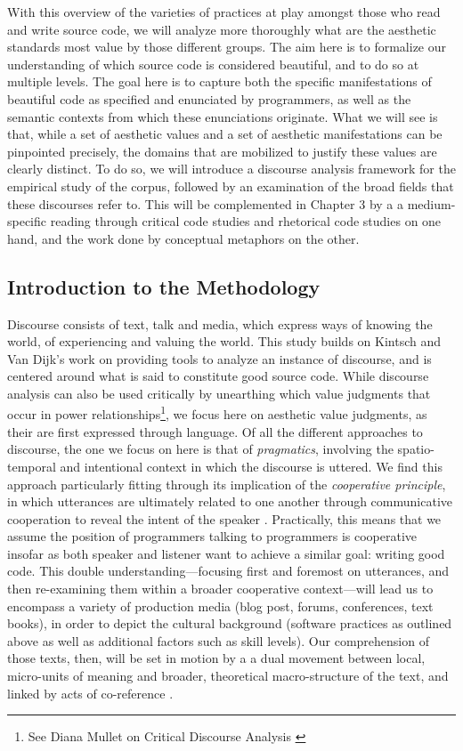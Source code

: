 With this overview of the varieties of practices at play amongst those who read and write source code, we will analyze more thoroughly what are the aesthetic standards most value by those different groups. The aim here is to formalize our understanding of which source code is considered beautiful, and to do so at multiple levels. The goal here is to capture both the specific manifestations of beautiful code as specified and enunciated by programmers, as well as the semantic contexts from which these enunciations originate. What we will see is that, while a set of aesthetic values and a set of aesthetic manifestations can be pinpointed precisely, the domains that are mobilized to justify these values are clearly distinct. To do so, we will introduce a discourse analysis framework for the empirical study of the corpus, followed by an examination of the broad fields that these discourses refer to. This will be complemented in Chapter 3 by a a medium-specific reading through critical code studies and rhetorical code studies on one hand, and the work done by conceptual metaphors on the other.

\subsection{Introduction to the Methodology}
\label{subsec:ideals-methodology}

Discourse consists of text, talk and media, which express ways of knowing the world, of experiencing and valuing the world. This study builds on Kintsch and Van Dijk's work on providing tools to analyze an instance of discourse, and is centered around what is said to constitute good source code. While discourse analysis can also be used critically by unearthing which value judgments that occur in power relationships\footnote{See Diana Mullet on Critical Discourse Analysis \citep{mullet_general_2018a}}, we focus here on aesthetic value judgments, as their are first expressed through language. Of all the different approaches to discourse, the one we focus on here is that of \emph{pragmatics}, involving the spatio-temporal and intentional context in which the discourse is uttered. We find this approach particularly fitting through its implication of the \emph{cooperative principle}, in which utterances are ultimately related to one another through communicative cooperation to reveal the intent of the speaker \citep{schiffrin_approaches_1994}. Practically, this means that we assume the position of programmers talking to programmers is cooperative insofar as both speaker and listener want to achieve a similar goal: writing good code. This double understanding—focusing first and foremost on utterances, and then re-examining them within a broader cooperative context—will lead us to encompass a variety of production media (blog post, forums, conferences, text books), in order to depict the cultural background (software practices as outlined above as well as additional factors such as skill levels). Our comprehension of those texts, then, will be set in motion by a a dual movement between local, micro-units of meaning and broader, theoretical macro-structure of the text, and linked by acts of co-reference \citep{kintsch_model_1978}.

